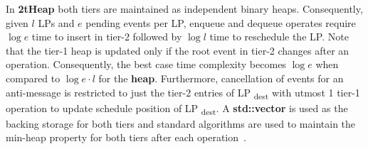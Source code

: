 In \textbf{2tHeap} both tiers are maintained as independent binary heaps. Consequently, given $l$ LPs and $e$ pending events per LP, enqueue and dequeue operates require
$\log e$ time to insert in tier-2 followed by $\log l$ time to reschedule the LP. Note that the tier-1 heap is updated only if the root event in tier-2 changes after an operation. Consequently, the best case time complexity becomes $\log e$ when compared to $\log e\cdot l$ for the \textbf{heap}. Furthermore, cancellation of events for an anti-message is restricted to just the tier-2 entries of LP \textsubscript{dest}  with utmost 1 tier-1 operation to update schedule position of LP \textsubscript{dest}. A \textbf{std::vector} is used as the backing storage for both tiers and standard algorithms are used to maintain the min-heap property for both tiers after each operation~\cite{higiro2017multi}.

